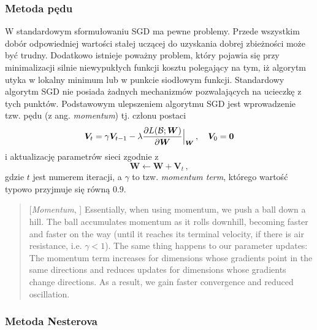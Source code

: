 \documentclass{myclass}
\numberwithin{equation}{subsection}
\begin{document}
\subsubsection{Metoda pędu}

W standardowym sformułowaniu SGD ma pewne problemy. Przede wszystkim dobór odpowiedniej wartości
stałej uczącej do uzyskania dobrej zbieżności może być trudny. Dodatkowo istnieje poważny problem,
który pojawia się przy minimalizacji silnie niewypukłych funkcji kosztu polegający na tym, iż
algorytm utyka w lokalny minimum lub w punkcie siodłowym funkcji. Standardowy algorytm SGD nie
posiada żadnych mechanizmów pozwalających na ucieczkę z tych punktów. Podstawowym ulepszeniem
algorytmu SGD jest wprowadzenie tzw. pędu (z ang. \textit{momentum}) tj. członu postaci
\[
\bm{V}_t = \gamma \bm{V}_{t-1} - \lambda \pdv{L(\mathcal{B}; \bm{W})}{\bm{W}}\Big|_{\bm{W}}\,,\quad \bm{V}_0 = \bm{0}
\]
i aktualizację parametrów sieci zgodnie z
\[
\bm{W} \gets \bm{W} + \bm{V}_t\,,
\]
gdzie \(t\) jest numerem iteracji, a \(\gamma\) to tzw. \textit{momentum term}, którego wartość
typowo przyjmuje się równą \(0.9\).

\begin{quote}[\textit{Momentum}, \cite{ruder2017overviewgradientdescentoptimization}]
Essentially, when using momentum, we push a ball down a hill. The ball accumulates momentum as it
rolls downhill, becoming faster and faster on the way (until it reaches its terminal velocity, if
there is air resistance, i.e. \(\gamma < 1\)). The same thing happens to our parameter updates: The
momentum term increases for dimensions whose gradients point in the same directions and reduces
updates for dimensions whose gradients change directions. As a result, we gain faster convergence
and reduced oscillation.
\end{quote}

\subsubsection{Metoda Nesterova}
\end{document}
